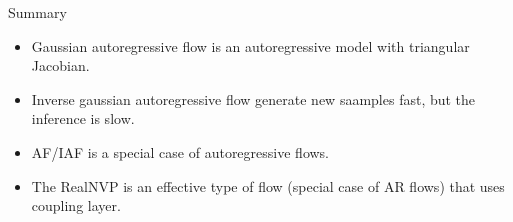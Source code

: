 \begin{frame}{Summary}
	\begin{itemize}
		\item Gaussian autoregressive flow is an autoregressive model with triangular Jacobian.
		\vfill
		\item Inverse gaussian autoregressive flow generate new saamples fast, but the inference is slow.
		\vfill
		\item AF/IAF is a special case of autoregressive flows.
		\vfill
		\item The RealNVP is an effective type of flow (special case of AR flows) that uses coupling layer.
	\end{itemize}
\end{frame}
 
